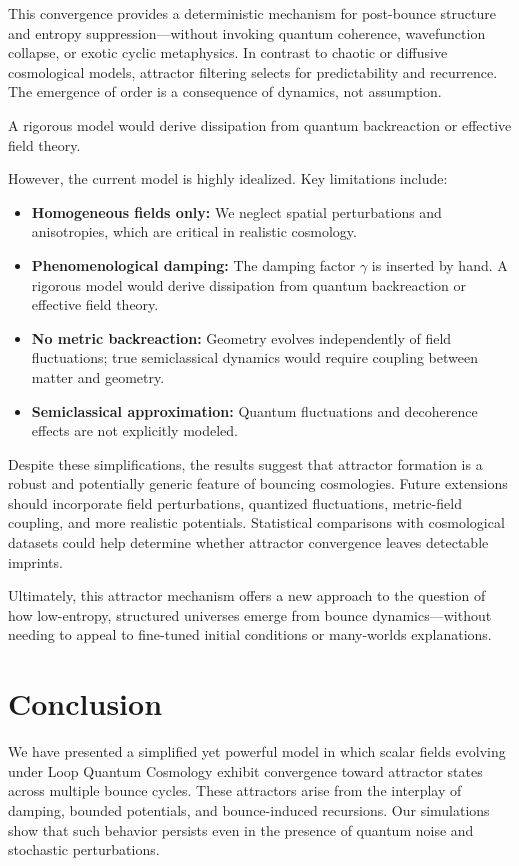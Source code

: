 \documentclass[12pt]{article}
\begin{document}
This convergence provides a deterministic mechanism for post-bounce structure and entropy suppression—without invoking quantum coherence, wavefunction collapse, or exotic cyclic metaphysics. In contrast to chaotic or diffusive cosmological models, attractor filtering selects for predictability and recurrence. The emergence of order is a consequence of dynamics, not assumption.

A rigorous model would derive dissipation from quantum backreaction or effective field theory\cite{Bojowald2008}.


However, the current model is highly idealized. Key limitations include:

\begin{itemize}
  \item \textbf{Homogeneous fields only:} We neglect spatial perturbations and anisotropies, which are critical in realistic cosmology.
  \item \textbf{Phenomenological damping:} The damping factor $\gamma$ is inserted by hand. A rigorous model would derive dissipation from quantum backreaction or effective field theory.
  \item \textbf{No metric backreaction:} Geometry evolves independently of field fluctuations; true semiclassical dynamics would require coupling between matter and geometry.
  \item \textbf{Semiclassical approximation:} Quantum fluctuations and decoherence effects are not explicitly modeled.
\end{itemize}

Despite these simplifications, the results suggest that attractor formation is a robust and potentially generic feature of bouncing cosmologies. Future extensions should incorporate field perturbations, quantized fluctuations, metric-field coupling, and more realistic potentials. Statistical comparisons with cosmological datasets could help determine whether attractor convergence leaves detectable imprints.

Ultimately, this attractor mechanism offers a new approach to the question of how low-entropy, structured universes emerge from bounce dynamics—without needing to appeal to fine-tuned initial conditions or many-worlds explanations.
\section{Conclusion}

We have presented a simplified yet powerful model in which scalar fields evolving under Loop Quantum Cosmology exhibit convergence toward attractor states across multiple bounce cycles. These attractors arise from the interplay of damping, bounded potentials, and bounce-induced recursions. Our simulations show that such behavior persists even in the presence of quantum noise and stochastic perturbations.
\end{document}
